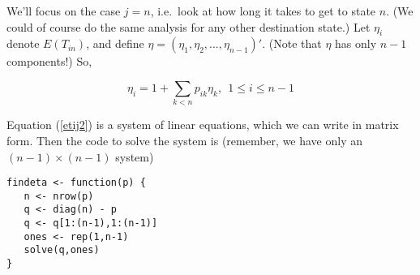 We'll focus on the case $j = n$, i.e.\ look at how long it takes to get
to state $n$.  (We could of course do the same analysis for any other
destination state.)
Let $\eta_{i}$ denote $E(T_{in})$, and define  $\eta =
(\eta_1,\eta_2,...,\eta_{n-1})'$.  (Note that $\eta$ has only $n-1$
components!)  So,

\begin{equation}
\label{etij2}
\eta_{i}
= 1 + \sum_{k < n} p_{ik} \eta_k, ~~
1 \leq i \leq n-1
\end{equation}

Equation (\ref{etij2}) is a system of linear equations, which we can
write in matrix form.  Then the code to solve the system is
(remember, we have only an $(n-1) \times (n-1)$ system)

\begin{lstlisting}                                                              
findeta <- function(p) {                                                        
   n <- nrow(p)                                                                 
   q <- diag(n) - p                                                             
   q <- q[1:(n-1),1:(n-1)]                                                      
   ones <- rep(1,n-1)                                                           
   solve(q,ones)                                                                
}                                                                               
\end{lstlisting}                        

